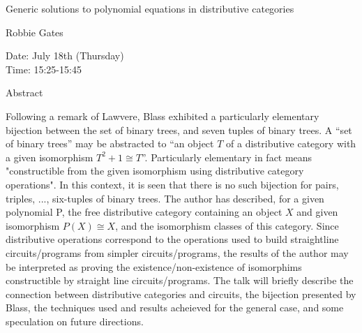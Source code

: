 \begin{center}
\LARGE
Generic solutions to polynomial equations in distributive
                            categories
\end{center}

\begin{center}
\Large
Robbie Gates
\end{center}

\noindent
Date:  July 18th (Thursday)\\
Time:  15:25-15:45\\

\begin{center}
\large
Abstract
\end{center}

Following a remark of Lawvere, Blass exhibited a particularly elementary bijection between the
set of binary trees, and seven tuples of binary trees. A ``set of
binary trees'' may be abstracted to ``an object $T$ of a distributive category with a given isomorphism $T^2 + 1 \cong T$''.
Particularly elementary in fact means "constructible from the given isomorphism using
distributive category operations". In this context, it is seen that there is no such bijection for pairs,
triples, ..., six-tuples of binary trees. The author has described, for a given polynomial P, the free
distributive category containing an object $X$ and given isomorphism $P(X) \cong X$, and the
isomorphism classes of this category. Since distributive operations correspond to the operations
used to build straightline circuits/programs from simpler circuits/programs, the results of the
author may be interpreted as proving the existence/non-existence of isomorphims constructible by
straight line circuits/programs. The talk will briefly describe the connection between distributive
categories and circuits, the bijection presented by Blass, the techniques used and results acheieved
for the general case, and some speculation on future directions. 

